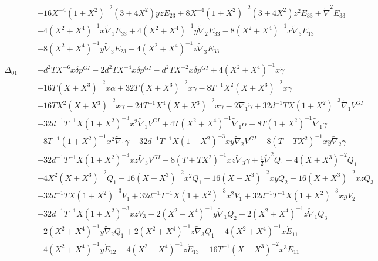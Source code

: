 \documentclass[10pt,letterpaper]{article}
\numberwithin{equation}{section}
\begin{document}
\begin{eqnarray}
&& + 16 X^{-4} (1 + X^2)^{-2} (3 + 4 X^2) y z E_{23} + 8 X^{-4} (1 + X^2)^{-2} (3 + 4 X^2) z^2 E_{33} + \tilde{\nabla}^{2}E_{33} \nonumber \\ 
&& + 4 (X^2 + X^4)^{-1} x \tilde{\nabla}_{1}E_{33} + 4 (X^2 + X^4)^{-1} y \tilde{\nabla}_{2}E_{33} - 8 (X^2 + X^4)^{-1} x \tilde{\nabla}_{3}E_{13} \nonumber \\ 
&& - 8 (X^2 + X^4)^{-1} y \tilde{\nabla}_{3}E_{23} - 4 (X^2 + X^4)^{-1} z \tilde{\nabla}_{3}E_{33}
\\  \nonumber\\ 
\Delta_{01}&=& - d^2 T X^{-6} x \delta p^{GI}{} - 2 d^2 T X^{-4} x \delta p^{GI}{} -  d^2 T X^{-2} x \delta p^{GI}{} + 4 (X^2 + X^4)^{-1} x \dot{\gamma} \nonumber \\ 
&& + 16 T (X + X^3)^{-2} x \alpha + 32 T (X + X^3)^{-2} x \gamma - 8 T^{-1} X^2 (X + X^3)^{-2} x \gamma \nonumber \\ 
&& + 16 T X^2 (X + X^3)^{-2} x \gamma - 24 T^{-1} X^4 (X + X^3)^{-2} x \gamma - 2 \tilde{\nabla}_{1}\dot{\gamma} + 32 d^{-1} T X (1 + X^2)^{-3} \tilde{\nabla}_{1}V^{GI}{} \nonumber \\ 
&& + 32 d^{-1} T^{-1} X (1 + X^2)^{-3} x^2 \tilde{\nabla}_{1}V^{GI}{} + 4 T (X^2 + X^4)^{-1} \tilde{\nabla}_{1}\alpha - 8 T (1 + X^2)^{-1} \tilde{\nabla}_{1}\gamma \nonumber \\ 
&& - 8 T^{-1} (1 + X^2)^{-1} x^2 \tilde{\nabla}_{1}\gamma + 32 d^{-1} T^{-1} X (1 + X^2)^{-3} x y \tilde{\nabla}_{2}V^{GI}{} - 8 (T + T X^2)^{-1} x y \tilde{\nabla}_{2}\gamma \nonumber \\ 
&& + 32 d^{-1} T^{-1} X (1 + X^2)^{-3} x z \tilde{\nabla}_{3}V^{GI}{} - 8 (T + T X^2)^{-1} x z \tilde{\nabla}_{3}\gamma +\tfrac{1}{2} \tilde{\nabla}^{2}Q_{1} - 4 (X + X^3)^{-2} Q_{1} \nonumber \\ 
&& - 4 X^2 (X + X^3)^{-2} Q_{1} - 16 (X + X^3)^{-2} x^2 Q_{1} - 16 (X + X^3)^{-2} x y Q_{2} - 16 (X + X^3)^{-2} x z Q_{3} \nonumber \\ 
&& + 32 d^{-1} T X (1 + X^2)^{-3} V_{1} + 32 d^{-1} T^{-1} X (1 + X^2)^{-3} x^2 V_{1} + 32 d^{-1} T^{-1} X (1 + X^2)^{-3} x y V_{2} \nonumber \\ 
&& + 32 d^{-1} T^{-1} X (1 + X^2)^{-3} x z V_{3} - 2 (X^2 + X^4)^{-1} y \tilde{\nabla}_{1}Q_{2} - 2 (X^2 + X^4)^{-1} z \tilde{\nabla}_{1}Q_{3} \nonumber \\ 
&& + 2 (X^2 + X^4)^{-1} y \tilde{\nabla}_{2}Q_{1} + 2 (X^2 + X^4)^{-1} z \tilde{\nabla}_{3}Q_{1}-4 (X^2 + X^4)^{-1} x \dot{E}_{11} \nonumber \\ 
&& - 4 (X^2 + X^4)^{-1} y \dot{E}_{12} - 4 (X^2 + X^4)^{-1} z \dot{E}_{13} - 16 T^{-1} (X + X^3)^{-2} x^3 E_{11} \nonumber \\ 

\end{eqnarray}
\end{document}
